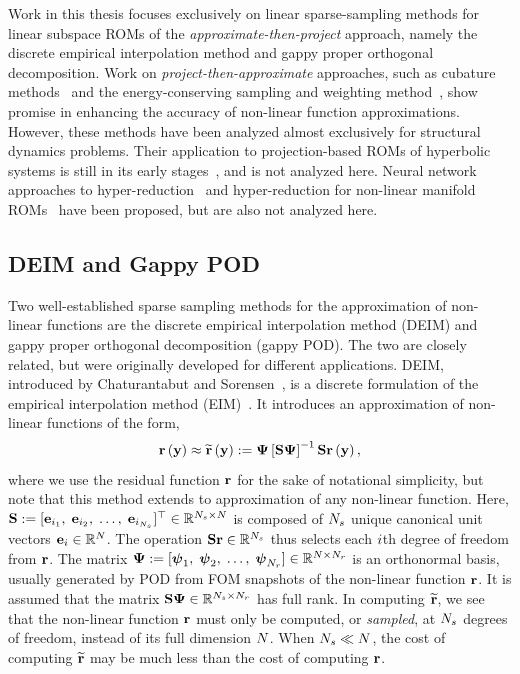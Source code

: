 Work in this thesis focuses exclusively on linear sparse-sampling methods for linear subspace ROMs of the \textit{approximate-then-project} approach, namely the discrete empirical interpolation method and gappy proper orthogonal decomposition. Work on \textit{project-then-approximate} approaches, such as cubature methods~\cite{An2008,Hernandez2017} and the energy-conserving sampling and weighting method~\cite{Farhat2014}, show promise in enhancing the accuracy of non-linear function approximations. However, these methods have been analyzed almost exclusively for structural dynamics problems. Their application to projection-based ROMs of hyperbolic systems is still in its early stages~\cite{Grimberg2020Hyper}, and is not analyzed here. Neural network approaches to hyper-reduction~\cite{nnHyperRed} and hyper-reduction for non-linear manifold ROMs~\cite{Kim2022} have been proposed, but are also not analyzed here.

\subsection{DEIM and Gappy POD}
%
Two well-established sparse sampling methods for the approximation of non-linear functions are the discrete empirical interpolation method (DEIM) and gappy proper orthogonal decomposition (gappy POD). The two are closely related, but were originally developed for different applications. DEIM, introduced by Chaturantabut and Sorensen~\cite{Chaturantabut2010}, is a discrete formulation of the empirical interpolation method (EIM)~\cite{Barrault2004}. It introduces an approximation of non-linear functions of the form,
%
\begin{equation}\label{eq:deimRHSApprox}
    \resFunc{\dummyVec} \approx \resApproxFunc{\dummyVec} \defEq \deimBasis \left[ \sampMat \deimBasis \right]^{-1} \sampMat \resFunc{\dummyVec},
\end{equation}
%
where we use the residual function $\mathbf{r}$ for the sake of notational simplicity, but note that this method extends to approximation of any non-linear function. Here, $\mathbf{S} := [\mathbf{e}_{i_1}, \; \mathbf{e}_{i_2}, \; \hdots, \; \mathbf{e}_{i_{N_s}} ]^\top \in \mathbb{R}^{N_s \times N}$ is composed of $N_s$ unique canonical unit vectors $\mathbf{e}_{i} \in \mathbb{R}^{N}$. The operation $\mathbf{S} \mathbf{r} \in \mathbb{R}^{N_s}$ thus selects each $i$th degree of freedom from $\mathbf{r}$. The matrix $\deimBasis \defEq [\deimBasisVec_1, \; \deimBasisVec_2, \; \hdots, \; \deimBasisVec_{\numResModes}] \inRTwo{\numDOF}{\numResModes}$ is an orthonormal basis, usually generated by POD from FOM snapshots of the non-linear function $\mathbf{r}$. It is assumed that the matrix $\sampMat \deimBasis \inRTwo{\numSamps}{\numResModes}$ has full rank. In computing $\mathbf{\widetilde{r}}$, we see that the non-linear function $\mathbf{r}$ must only be computed, or \textit{sampled}, at $N_s$ degrees of freedom, instead of its full dimension $N$. When $N_s \ll N$, the cost of computing $\mathbf{\widetilde{r}}$ may be much less than the cost of computing $\mathbf{r}$.

